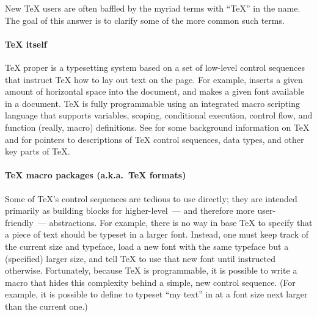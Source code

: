 
New \TeX{} users are often baffled by the myriad terms with ``\TeX{}''
in the name.  The goal of this answer is to clarify some of the more
common such terms.

\paragraph{\TeX{} itself}
\TeX{} proper is a typesetting system based on a set of low-level
control sequences that instruct \TeX{} how to lay out text on the
page.  For example,  inserts a given amount of horizontal
space into the document, and  makes a given font available
in a document.  \TeX{} is fully programmable using an integrated macro
scripting language that supports variables, scoping, conditional
execution, control flow, and function (really, macro) definitions.
See %
 for some background
information on \TeX{} and %
 for pointers to
descriptions of \TeX{} control sequences, data types, and other key
parts of \TeX{}.

\paragraph{\TeX{} macro packages (a.k.a.~\TeX{} formats)}
Some of \TeX{}'s control sequences are tedious to use directly; they are
intended primarily as building blocks for higher-level~--- and therefore
more user-friendly~---  abstractions.  For example, there is no way in
base \TeX{} to specify that a piece of text should be typeset in a
larger font.  Instead, one must keep track of the current size and
typeface, load a new font with the same typeface but a (specified)
larger size, and tell \TeX{} to use that new font until instructed
otherwise.  Fortunately, because \TeX{} is programmable, it is
possible to write a macro that hides this complexity behind a simple,
new control sequence.  (For example, it is possible to define
 to typeset ``my text'' in
at a font size next larger than the current one.)

